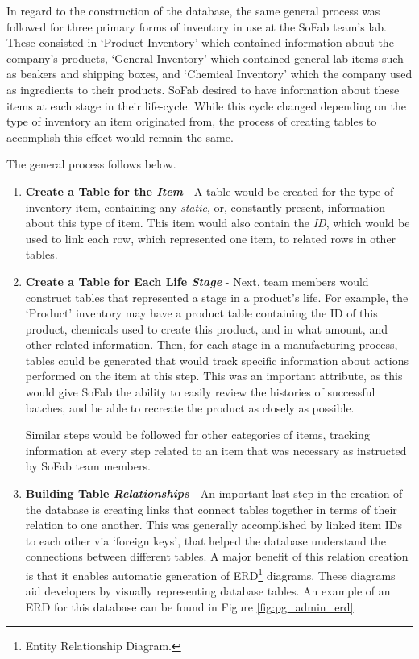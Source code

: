 \documentclass{article}
\begin{document}
In regard to the construction of the database, the same general process was followed for three primary forms of inventory in use 
at the SoFab team's lab. These consisted in `Product Inventory' which contained information about the company's products, 
`General Inventory' which contained general lab items such as beakers and shipping boxes, and `Chemical Inventory' which the 
company used as ingredients to their products. SoFab desired to have information about these items at each stage in their life-cycle. 
While this cycle changed depending on the type of inventory an item originated from, the process of creating tables to accomplish this
effect would remain the same. 

The general process follows below.
\begin{enumerate}
    \item \textbf{Create a Table for the \textit{Item}} - A table would be created for the type of inventory item, containing any 
        \textit{static}, or, constantly present, information about this type of item. This item would also contain the \textit{ID}, 
        which would be used to link each row, which represented one item, to related rows in other tables. 
    \item \textbf{Create a Table for Each Life \textit{Stage}} - Next, team members would construct tables that represented a stage in a 
        product's life. For example, the `Product' inventory may have a product table containing the ID of this product, chemicals used to 
        create this product, and in what amount, and other related information. Then, for each stage in a manufacturing process, 
        tables could be generated that would track specific information about actions performed on the item at this step. This was an
        important attribute, as this would give SoFab the ability to easily review the histories of successful batches, and be able to 
        recreate the product as closely as possible. 

        Similar steps would be followed for other categories of items, tracking information at every step related to an item that was 
        necessary as instructed by SoFab team members. 
    \item \textbf{Building Table \textit{Relationships}} - An important last step in the creation of the database is creating links 
        that connect tables together in terms of their relation to one another. This was generally accomplished by linked item IDs to 
        each other via `foreign keys', that helped the database understand the connections between different tables. A major benefit of 
        this relation creation is that it enables automatic generation of ERD\footnote{Entity Relationship Diagram.} diagrams. These 
        diagrams aid developers by visually representing database tables. An example of an ERD for this database can be found in 
        Figure \ref{fig:pg_admin_erd}.
\end{enumerate}
\end{document}
